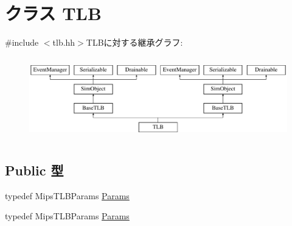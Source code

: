 \hypertarget{classMipsISA_1_1TLB}{
\section{クラス TLB}
\label{classMipsISA_1_1TLB}
}


{\ttfamily \#include $<$tlb.hh$>$}TLBに対する継承グラフ:\begin{figure}[H]
\begin{center}
\leavevmode
\includegraphics[height=3.6246cm]{classMipsISA_1_1TLB}
\end{center}
\end{figure}
\subsection*{Public 型}
\begin{DoxyCompactItemize}
\item 
typedef MipsTLBParams \hyperlink{classMipsISA_1_1TLB_a8fcac7e147ea0cf7183de360adcb6efe}{Params}
\item 
typedef MipsTLBParams \hyperlink{classMipsISA_1_1TLB_a8fcac7e147ea0cf7183de360adcb6efe}{Params}
\end{DoxyCompactItemize}
